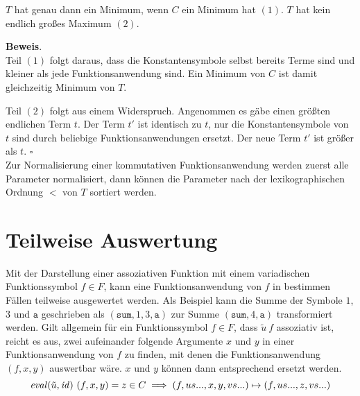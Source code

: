 \begin{lemma} \label{lemMinMax}
$T$ hat genau dann ein Minimum, wenn $C$ ein Minimum hat $(1)$. $T$ hat kein endlich großes Maximum $(2)$.
\end{lemma}

\textbf{Beweis}.\\
Teil $(1)$ folgt daraus, dass die Konstantensymbole selbst bereits Terme sind und kleiner als jede Funktionsanwendung sind. Ein Minimum von $C$ ist damit gleichzeitig Minimum von $T$.

Teil $(2)$ folgt aus einem Widerspruch. Angenommen es gäbe einen größten endlichen Term $t$. Der Term $t'$ ist identisch zu $t$, nur die Konstantensymbole von $t$ sind durch beliebige Funktionsanwendungen ersetzt. Der neue Term $t'$ ist größer als $t$.
\hfill $\square$\\

Zur Normalisierung einer kommutativen Funktionsanwendung werden zuerst alle Parameter normalisiert, dann können die Parameter nach der lexikographischen Ordnung $<$ von $T$ sortiert werden. 

\section{Teilweise Auswertung} \label{subsecNormalKombinieren}

\begin{algorithm}
\DontPrintSemicolon
\caption{$\Const{combine} \colon T \rightarrow T$}\label{combine}

\end{algorithm}

Mit der Darstellung einer assoziativen Funktion mit einem variadischen Funktionssymbol $f \in F$, kann eine Funktionsanwendung von $f$ in bestimmen Fällen teilweise ausgewertet werden. Als Beispiel kann die Summe der Symbole $1$, $3$ und $\texttt{a}$ geschrieben als $(\texttt{sum}, 1, 3, \texttt{a})$ zur Summe $(\texttt{sum}, 4, \texttt{a})$ transformiert werden. 
Gilt allgemein für ein Funktionssymbol $f \in F$, dass $\tilde u~f$ assoziativ ist, reicht es aus, zwei aufeinander folgende Argumente $x$ und $y$ in einer Funktionsanwendung von $f$ zu finden, mit denen die Funktionsanwendung $(f, x, y)$ auswertbar wäre. $x$ und $y$ können dann entsprechend ersetzt werden.
$$\mathit{eval}(\tilde u, \mathit{id})~(f, x, y) = z \in C \implies (f, us..., x, y, vs...) \mapsto (f, us..., z, vs...)$$

